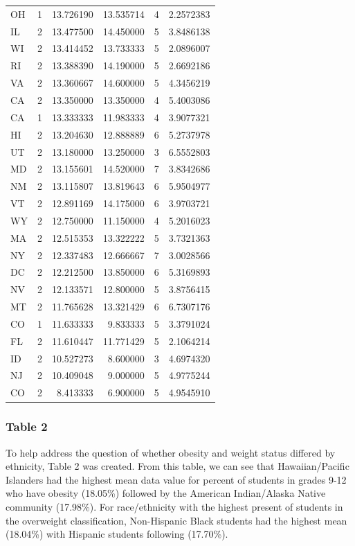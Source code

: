 \documentclass[
]{article}
\begin{document}
\begin{longtable}[t]{lrrrrr}
OH & 1 & 13.726190 & 13.535714 & 4 & 2.2572383\\
\addlinespace
IL & 2 & 13.477500 & 14.450000 & 5 & 3.8486138\\
WI & 2 & 13.414452 & 13.733333 & 5 & 2.0896007\\
RI & 2 & 13.388390 & 14.190000 & 5 & 2.6692186\\
VA & 2 & 13.360667 & 14.600000 & 5 & 4.3456219\\
CA & 2 & 13.350000 & 13.350000 & 4 & 5.4003086\\
\addlinespace
CA & 1 & 13.333333 & 11.983333 & 4 & 3.9077321\\
HI & 2 & 13.204630 & 12.888889 & 6 & 5.2737978\\
UT & 2 & 13.180000 & 13.250000 & 3 & 6.5552803\\
MD & 2 & 13.155601 & 14.520000 & 7 & 3.8342686\\
NM & 2 & 13.115807 & 13.819643 & 6 & 5.9504977\\
\addlinespace
VT & 2 & 12.891169 & 14.175000 & 6 & 3.9703721\\
WY & 2 & 12.750000 & 11.150000 & 4 & 5.2016023\\
MA & 2 & 12.515353 & 13.322222 & 5 & 3.7321363\\
NY & 2 & 12.337483 & 12.666667 & 7 & 3.0028566\\
DC & 2 & 12.212500 & 13.850000 & 6 & 5.3169893\\
\addlinespace
NV & 2 & 12.133571 & 12.800000 & 5 & 3.8756415\\
MT & 2 & 11.765628 & 13.321429 & 6 & 6.7307176\\
CO & 1 & 11.633333 & 9.833333 & 5 & 3.3791024\\
FL & 2 & 11.610447 & 11.771429 & 5 & 2.1064214\\
ID & 2 & 10.527273 & 8.600000 & 3 & 4.6974320\\
\addlinespace
NJ & 2 & 10.409048 & 9.000000 & 5 & 4.9775244\\
CO & 2 & 8.413333 & 6.900000 & 5 & 4.9545910\\
\bottomrule
\end{longtable}

\subsubsection{Table 2}\label{table-2}

To help address the question of whether obesity and weight status
differed by ethnicity, Table 2 was created. From this table, we can see
that Hawaiian/Pacific Islanders had the highest mean data value for
percent of students in grades 9-12 who have obesity (18.05\%) followed
by the American Indian/Alaska Native community (17.98\%). For
race/ethnicity with the highest present of students in the overweight
classification, Non-Hispanic Black students had the highest mean
(18.04\%) with Hispanic students following (17.70\%).
\end{document}

